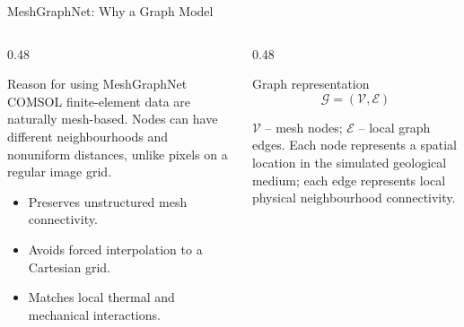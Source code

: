 
\begin{frame}{MeshGraphNet: Why a Graph Model}
  \begin{columns}[T]
    \begin{column}{0.48\textwidth}
      \begin{block}{Reason for using MeshGraphNet}
        \footnotesize
        COMSOL finite-element data are naturally mesh-based. Nodes can have
        different neighbourhoods and nonuniform distances, unlike pixels on a
        regular image grid.
      \end{block}
      \begin{itemize}
        \footnotesize
        \item Preserves unstructured mesh connectivity.
        \item Avoids forced interpolation to a Cartesian grid.
        \item Matches local thermal and mechanical interactions.
      \end{itemize}
    \end{column}
    \begin{column}{0.48\textwidth}
      \begin{block}{Graph representation}
        \[
          \mathcal{G}=(\mathcal{V},\mathcal{E})
        \]
      \end{block}
      \scriptsize
      $\mathcal{V}$ -- mesh nodes; $\mathcal{E}$ -- local graph edges.
      Each node represents a spatial location in the simulated geological
      medium; each edge represents local physical neighbourhood connectivity.
    \end{column}
  \end{columns}
\end{frame}

